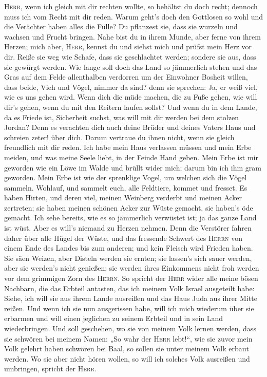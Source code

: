  \textsc{Herr}, wenn ich gleich mit dir rechten wollte, so
behältst du doch recht; dennoch muss ich vom Recht mit dir reden. Warum
geht's doch den Gottlosen so wohl und die Verächter haben alles die
Fülle?  Du pflanzest sie, dass sie wurzeln und wachsen und
Frucht bringen. Nahe bist du in ihrem Munde, aber ferne von ihrem
Herzen;  mich aber, \textsc{Herr}, kennst du und siehst
mich und prüfst mein Herz vor dir. Reiße sie weg wie Schafe, dass sie
geschlachtet werden; sondere sie aus, dass sie gewürgt werden.
 Wie lange soll doch das Land so jämmerlich stehen und das
Gras auf dem Felde allenthalben verdorren um der Einwohner Bosheit
willen, dass beide, Vieh und Vögel, nimmer da sind? denn sie sprechen:
Ja, er weiß viel, wie es uns gehen wird.  Wenn dich die
müde machen, die zu Fuße gehen, wie will dir's gehen, wenn du mit den
Reitern laufen sollst? Und wenn du in dem Lande, da es Friede ist,
Sicherheit suchst, was will mit dir werden bei dem stolzen Jordan?
 Denn es verachten dich auch deine Brüder und deines
Vaters Haus und schreien zeter! über dich. Darum vertraue du ihnen
nicht, wenn sie gleich freundlich mit dir reden.  Ich habe
mein Haus verlassen müssen und mein Erbe meiden, und was meine Seele
liebt, in der Feinde Hand geben.  Mein Erbe ist mir
geworden wie ein Löwe im Walde und brüllt wider mich; darum bin ich ihm
gram geworden.  Mein Erbe ist wie der sprenklige Vogel, um
welchen sich die Vögel sammeln. Wohlauf, und sammelt euch, alle
Feldtiere, kommet und fresset.  Es haben Hirten, und
deren viel, meinen Weinberg verderbt und meinen Acker zertreten; sie
haben meinen schönen Acker zur Wüste gemacht, sie haben's öde gemacht.
 Ich sehe bereits, wie es so jämmerlich verwüstet ist; ja
das ganze Land ist wüst. Aber es will's niemand zu Herzen nehmen.
 Denn die Verstörer fahren daher über alle Hügel der
Wüste, und das fressende Schwert des \textsc{Herrn} von einem Ende des
Landes bis zum anderen; und kein Fleisch wird Frieden haben.
 Sie säen Weizen, aber Disteln werden sie ernten; sie
lassen's sich sauer werden, aber sie werden's nicht genießen; sie werden
ihres Einkommens nicht froh werden vor dem grimmigen Zorn des
\textsc{Herrn}.  So spricht der \textsc{Herr} wider alle
meine bösen Nachbarn, die das Erbteil antasten, das ich meinem Volk
Israel ausgeteilt habe: Siehe, ich will sie aus ihrem Lande ausreißen
und das Haus Juda aus ihrer Mitte reißen.  Und wenn ich
sie nun ausgerissen habe, will ich mich wiederum über sie erbarmen und
will einen jeglichen zu seinem Erbteil und in sein Land wiederbringen.
 Und soll geschehen, wo sie von meinem Volk lernen
werden, dass sie schwören bei meinem Namen: „So wahr der \textsc{Herr}
lebt!{}``, wie sie zuvor mein Volk gelehrt haben schwören bei Baal, so
sollen sie unter meinem Volk erbaut werden.  Wo sie aber
nicht hören wollen, so will ich solches Volk ausreißen und umbringen,
spricht der \textsc{Herr}.

